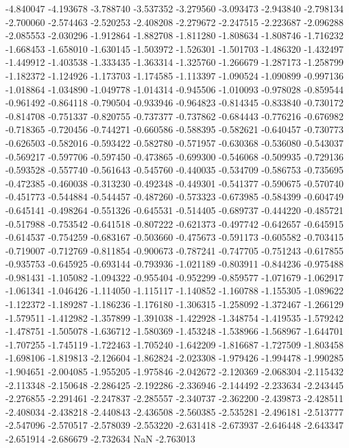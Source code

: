 -4.840047
-4.193678
-3.788740
-3.537352
-3.279560
-3.093473
-2.943840
-2.798134
-2.700060
-2.574463
-2.520253
-2.408208
-2.279672
-2.247515
-2.223687
-2.096288
-2.085553
-2.030296
-1.912864
-1.882708
-1.811280
-1.808634
-1.808746
-1.716232
-1.668453
-1.658010
-1.630145
-1.503972
-1.526301
-1.501703
-1.486320
-1.432497
-1.449912
-1.403538
-1.333435
-1.363314
-1.325760
-1.266679
-1.287173
-1.258799
-1.182372
-1.124926
-1.173703
-1.174585
-1.113397
-1.090524
-1.090899
-0.997136
-1.018864
-1.034890
-1.049778
-1.014314
-0.945506
-1.010093
-0.978028
-0.859544
-0.961492
-0.864118
-0.790504
-0.933946
-0.964823
-0.814345
-0.833840
-0.730172
-0.814708
-0.751337
-0.820755
-0.737377
-0.737862
-0.684443
-0.776216
-0.676982
-0.718365
-0.720456
-0.744271
-0.660586
-0.588395
-0.582621
-0.640457
-0.730773
-0.626503
-0.582016
-0.593422
-0.582780
-0.571957
-0.630368
-0.536080
-0.543037
-0.569217
-0.597706
-0.597450
-0.473865
-0.699300
-0.546068
-0.509935
-0.729136
-0.593528
-0.557740
-0.561643
-0.545760
-0.440035
-0.534709
-0.586753
-0.735695
-0.472385
-0.460038
-0.313230
-0.492348
-0.449301
-0.541377
-0.590675
-0.570740
-0.451773
-0.544884
-0.544457
-0.487260
-0.573323
-0.673985
-0.584399
-0.604749
-0.645141
-0.498264
-0.551326
-0.645531
-0.514405
-0.689737
-0.444220
-0.485721
-0.517988
-0.753542
-0.641518
-0.807222
-0.621373
-0.497742
-0.642657
-0.645915
-0.614537
-0.754259
-0.683167
-0.503660
-0.475673
-0.591173
-0.605582
-0.703415
-0.719007
-0.712769
-0.811854
-0.900673
-0.787241
-0.747705
-0.751243
-0.617855
-0.935753
-0.645925
-0.693144
-0.793936
-1.021189
-0.803911
-0.844236
-0.975488
-0.981431
-1.105082
-1.094322
-0.955404
-0.952299
-0.859577
-1.071679
-1.062917
-1.061341
-1.046426
-1.114050
-1.115117
-1.140852
-1.160788
-1.155305
-1.089622
-1.122372
-1.189287
-1.186236
-1.176180
-1.306315
-1.258092
-1.372467
-1.266129
-1.579511
-1.412982
-1.357899
-1.391038
-1.422928
-1.348754
-1.419535
-1.579242
-1.478751
-1.505078
-1.636712
-1.580369
-1.453248
-1.538966
-1.568967
-1.644701
-1.707255
-1.745119
-1.722463
-1.705240
-1.642209
-1.816687
-1.727509
-1.803458
-1.698106
-1.819813
-2.126604
-1.862824
-2.023308
-1.979426
-1.994478
-1.990285
-1.904651
-2.004085
-1.955205
-1.975846
-2.042672
-2.120369
-2.068304
-2.115432
-2.113348
-2.150648
-2.286425
-2.192286
-2.336946
-2.144492
-2.233634
-2.243445
-2.276855
-2.291461
-2.247837
-2.285557
-2.340737
-2.362200
-2.439873
-2.428511
-2.408034
-2.438218
-2.440843
-2.436508
-2.560385
-2.535281
-2.496181
-2.513777
-2.547096
-2.570517
-2.578039
-2.553220
-2.631418
-2.673937
-2.646448
-2.643347
-2.651914
-2.686679
-2.732634
NaN
-2.763013
